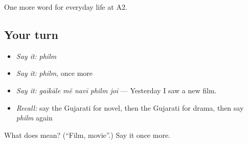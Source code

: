 \begin{grammarlens}[title={What you've built}]
One more word for everyday life at A2.
\end{grammarlens}

\subsection*{Your turn}
\begin{itemize}
\raggedright
  \item \emph{Say it:} \emph{philm}
  \item \emph{Say it:} \emph{philm}, once more
  \item \emph{Say it:} \emph{gaīkāle mẽ navī philm joī} — Yesterday I saw a new film.
  \item \emph{Recall:} say the Gujarati for novel, then the Gujarati for drama, then say \emph{philm} again
\end{itemize}

\begin{tcolorbox}[breakable,colback=teal!4,colframe=teal!35!black,title={Before you move on}]
What does  mean? (\textquotedblleft{}Film, movie\textquotedblright{}.) Say it once more.
\end{tcolorbox}
